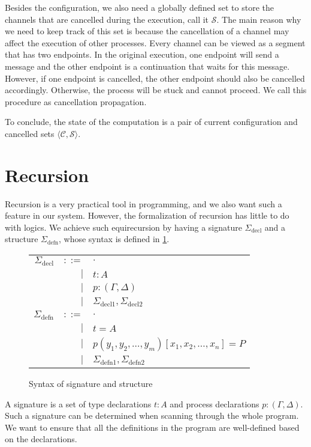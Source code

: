 \documentclass[12pt, openany]{memoir}
\newcommand*{\config}[0]{\mathcal{C}}
\newcommand*{\cancelSet}[0]{\mathcal{S}}
\begin{document}
Besides the configuration, we also need a globally defined set to store the channels that are cancelled during the execution, call it $\cancelSet$.
The main reason why we need to keep track of this set is because the cancellation of a channel may affect the execution of other processes.
Every channel can be viewed as a segment that has two endpoints. In the original execution, one endpoint will send a message and the other endpoint is a continuation that waits for this message.
However, if one endpoint is cancelled, the other endpoint should also be cancelled accordingly. 
Otherwise, the process will be stuck and cannot proceed. We call this procedure as cancellation propagation.

To conclude, the state of the computation is a pair of current configuration and cancelled sets $\langle \config, \cancelSet \rangle$.
\section{Recursion}
Recursion is a very practical tool in programming, 
and we also want such a feature in our system. However, the formalization of recursion has little to do with logics. 
We achieve such equirecursion by having a signature $\Sigma_{\text{decl}}$ and a structure $\Sigma_{\text{defn}}$, 
whose syntax is defined in \cref{fig:syntaxsig}.
\begin{figure}[H]
  \centering
  \begin{tabular}{r r l}
    $\Sigma_{\text{decl}}$ & $::=$ & $\cdot$ \\
    & $\mid$ & $t : A$ \\
    & $\mid$ & $p : (\Gamma, \Delta)$ \\
    & $\mid$ & $\Sigma_{\text{decl}1}, \Sigma_{\text{decl}2}$ \\  
    $\Sigma_{\text{defn}}$ & $::=$ & $\cdot$ \\
    & $\mid$ & $t = A$ \\
    & $\mid$ & $p (y_1, y_2, \ldots, y_m)[x_1, x_2, \ldots, x_n]= P$ \\
    & $\mid$ & $\Sigma_{\text{defn}1}, \Sigma_{\text{defn}2}$
    \end{tabular}
  \caption{Syntax of signature and structure}
  \label{fig:syntaxsig}
\end{figure}
A signature is a set of type declarations $t : A$ and process declarations $p : (\Gamma, \Delta)$. 
Such a signature can be determined when scanning through the whole program. 
We want to ensure that all the definitions in the program are well-defined based on the declarations. 
\end{document}
